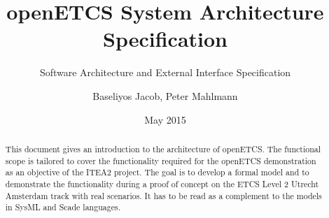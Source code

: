 \documentclass{template/openetcs_report}
\begin{document}
\frontmatter
{}

\newcommand{\define}[1]{\index{#1}\emph{#1}}







\title{openETCS System Architecture Specification}

\subtitle{Software Architecture and External Interface Specification}

\date{May 2015}








\author{Baseliyos Jacob, Peter Mahlmann}





\newpage


\begin{abstract}
This document gives an introduction to the architecture of openETCS. The functional scope is tailored to cover the functionality required for the openETCS demonstration as an objective of the ITEA2 project. The goal is to develop a formal model and to demonstrate the functionality during a proof of concept on the ETCS Level 2 Utrecht Amsterdam track with real scenarios. It has to be read as a complement to the models in SysML and Scade languages. 
\end{abstract}

\maketitle
\end{document}
